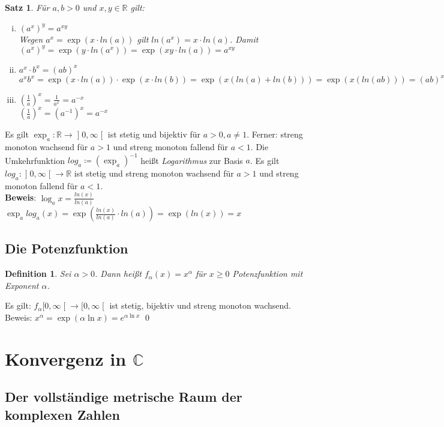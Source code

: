 \documentclass[ngerman,titlepage,twoside, parskip=half*]{scrreprt}
\newcommand*{\R}{\mathbb{R}}
\newcommand*{\C}{\mathbb{C}}
\theoremstyle{break}
\newtheorem{theorem}{Satz}[section]
\newtheorem{definition}{Definition}[chapter]
\theoremstyle{nonumberbreak}
\newcommand*{\rsofint}[1]{[#1\mathclose{[}}  %
\newcommand*{\bsofint}[1]{\mathopen{]}#1\mathclose{[}} %
\begin{document}
\begin{theorem}
Für $a,b>0$ und $x,y\in \R$ gilt:
\begin{enumerate}[i)]
  \item $(a^x)^y=a^{xy}$\\
    Wegen $a^x=\exp(x \cdot ln(a))$ gilt $ln (a^x)=x \cdot ln (a)$. Damit $(a^x)^y=\exp(y\cdot ln(a^x))=\exp(xy\cdot ln(a))
    =a^{xy}$
  \item $a^x\cdot b^x=(ab)^x$\\
    $a^xb^x=\exp(x\cdot ln(a))\cdot \exp(x\cdot ln(b))=\exp(x(ln(a)+ln(b)))=\exp(x(ln(ab)))=(ab)^x$
  \item $(\frac{1}{a})^x=\frac{1}{a^x}=a^{-x}$\\
    $(\frac{1}{a})^x=(a^{-1})^x=a^{-x}$
\end{enumerate}
\end{theorem}

Es gilt $\exp_a \colon\R\rightarrow \bsofint{0,\infty}$ ist stetig und bijektiv für $a>0, a\neq 1$. Ferner: streng monoton wachsend
für $a>1$ und streng monoton fallend für $a<1$.
Die Umkehrfunktion $log_a\coloneqq(\exp_a)^{-1}$ heißt \emph{Logarithmus} zur Basis $a$. Es gilt $log_a\colon
\bsofint{0,\infty} \rightarrow \R$ ist stetig und streng monoton wachsend für $a>1$ und streng monoton fallend für $a<1$.\\
\textbf{Beweis}: $\log_ax=\frac{ln(x)}{ln(a)}$\\
$\exp_alog_a(x)=\exp(\frac{ln(x)}{ln(a)}\cdot ln (a))=\exp (ln (x))=x$

\subsection{Die Potenzfunktion}
\begin{definition}
Sei $\alpha>0$. Dann heißt $f_{\alpha}(x)=x^{\alpha}$ für $x\geq 0$ \emph{Potenzfunktion}
mit Exponent $\alpha$.
\end{definition}

Es gilt: $f_{\alpha}\rsofint{0,\infty}\rightarrow \rsofint{0,\infty}$ ist stetig, bijektiv und streng monoton
wachsend.\\
Beweis: $x^{\alpha}=\exp(\alpha \ln x)=e^{\alpha \ln x}$
\qed

\section{Konvergenz in \texorpdfstring{$\C$}{C}}
\subsection{Der vollständige metrische Raum der komplexen Zahlen}
\end{document}

